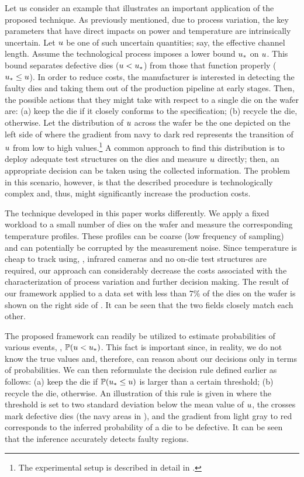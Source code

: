 
Let us consider an example that illustrates an important application of the proposed technique. As previously mentioned, due to process variation, the key parameters that have direct impacts on power and temperature are intrinsically uncertain. Let $u$ be one of such uncertain quantities; say, the effective channel length.
Assume the technological process imposes a lower bound $u_*$ on $u$. This bound separates defective dies ($u < u_*$) from those that function properly ($u_* \leq u$).
In order to reduce costs, the manufacturer is interested in detecting the faulty dies and taking them out of the production pipeline at early stages. Then, the possible actions that they might take with respect to a single die on the wafer are: (a) keep the die if it closely conforms to the specification; (b) recycle the die, otherwise.
Let the distribution of $u$ across the wafer be the one depicted on the left side of  where the gradient from navy to dark red represents the transition of $u$ from low to high values.\footnote{The experimental setup is described in detail in .}
A common approach to find this distribution is to deploy adequate test structures on the dies and measure $u$ directly; then, an appropriate decision can be taken using the collected information. The problem in this scenario, however, is that the described procedure is technologically complex and, thus, might significantly increase the production costs.

The technique developed in this paper works differently. We apply a fixed workload to a small number of dies on the wafer and measure the corresponding temperature profiles. These profiles can be coarse (low frequency of sampling) and can potentially be corrupted by the measurement noise. Since temperature is cheap to track using, \eg, infrared cameras and no on-die test structures are required, our approach can considerably decrease the costs associated with the characterization of process variation and further decision making.
The result of our framework applied to a data set with less than $7\%$ of the dies on the wafer is shown on the right side of . It can be seen that the two fields closely match each other.

The proposed framework can readily be utilized to estimate probabilities of various events, \eg, $\mathbb{P}(u < u_*)$. This fact is important since, in reality, we do not know the true values and, therefore, can reason about our decisions only in terms of probabilities. We can then reformulate the decision rule defined earlier as follows: (a) keep the die if $\mathbb{P}(u_* \leq u)$ is larger than a certain threshold; (b) recycle the die, otherwise.
An illustration of this rule is given in  where the threshold is set to two standard deviation below the mean value of $u$, the crosses mark defective dies (the navy areas in ), and the gradient from light gray to red corresponds to the inferred probability of a die to be defective. It can be seen that the inference accurately detects faulty regions.


